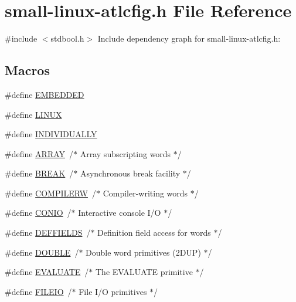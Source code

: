 \hypertarget{small-linux-atlcfig_8h}{}\section{small-\/linux-\/atlcfig.h File Reference}
\label{small-linux-atlcfig_8h}
{\ttfamily \#include $<$stdbool.\+h$>$}\newline
Include dependency graph for small-\/linux-\/atlcfig.h\+:
\subsection*{Macros}
\begin{DoxyCompactItemize}
\item 
\#define \hyperlink{small-linux-atlcfig_8h_ae47a1cb6076cec70cf9ea8efc1d5f3ff}{E\+M\+B\+E\+D\+D\+ED}
\item 
\#define \hyperlink{small-linux-atlcfig_8h_a157a956e14c5c44b3f73ef23a4776f64}{L\+I\+N\+UX}
\item 
\#define \hyperlink{small-linux-atlcfig_8h_a48c036bd8ba1fdc29f0981ff7ee3d9b5}{I\+N\+D\+I\+V\+I\+D\+U\+A\+L\+LY}
\item 
\#define \hyperlink{small-linux-atlcfig_8h_af579248b8d4c16c0aeba3dff9ee8b10a}{A\+R\+R\+AY}~/$\ast$ Array subscripting words $\ast$/
\item 
\#define \hyperlink{small-linux-atlcfig_8h_abe022c8f09db1f0680a92293523f25dd}{B\+R\+E\+AK}~/$\ast$ Asynchronous break facility $\ast$/
\item 
\#define \hyperlink{small-linux-atlcfig_8h_a6e870e0dd56eee50bae52b101eb2634d}{C\+O\+M\+P\+I\+L\+E\+RW}~/$\ast$ Compiler-\/writing words $\ast$/
\item 
\#define \hyperlink{small-linux-atlcfig_8h_a1dd720c7eba235287553f1628c4687e8}{C\+O\+N\+IO}~/$\ast$ Interactive console I/O $\ast$/
\item 
\#define \hyperlink{small-linux-atlcfig_8h_a5e8c22a8ef7ae74e64818fed0e1427e5}{D\+E\+F\+F\+I\+E\+L\+DS}~/$\ast$ Definition field access for words $\ast$/
\item 
\#define \hyperlink{small-linux-atlcfig_8h_a8747af38b86aa2bbcda2f1b1aa0888c2}{D\+O\+U\+B\+LE}~/$\ast$ Double word primitives (2\+D\+U\+P) $\ast$/
\item 
\#define \hyperlink{small-linux-atlcfig_8h_ad3787f1b5599150eab9d3ca887d75640}{E\+V\+A\+L\+U\+A\+TE}~/$\ast$ The E\+V\+A\+L\+U\+A\+TE primitive $\ast$/
\item 
\#define \hyperlink{small-linux-atlcfig_8h_a6031789d52541d1bd1e7b028322fd7fd}{F\+I\+L\+E\+IO}~/$\ast$ File I/O primitives $\ast$/

\end{DoxyCompactItemize}
